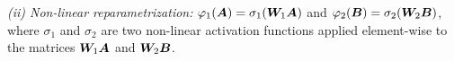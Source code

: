 \emph{(ii) Non-linear reparametrization:} $\varphi_1({{\bm A}})=\sigma_1(\bm{W}_1{\bm A})$ and $\varphi_2({{\bm B}})=\sigma_2(\bm{W}_2{\bm B})$, where $\sigma_1$ and $\sigma_2$ are two non-linear activation functions applied element-wise to the matrices $\bm{W}_1{\bm A}$ and $\bm{W}_2{\bm B}$. 



